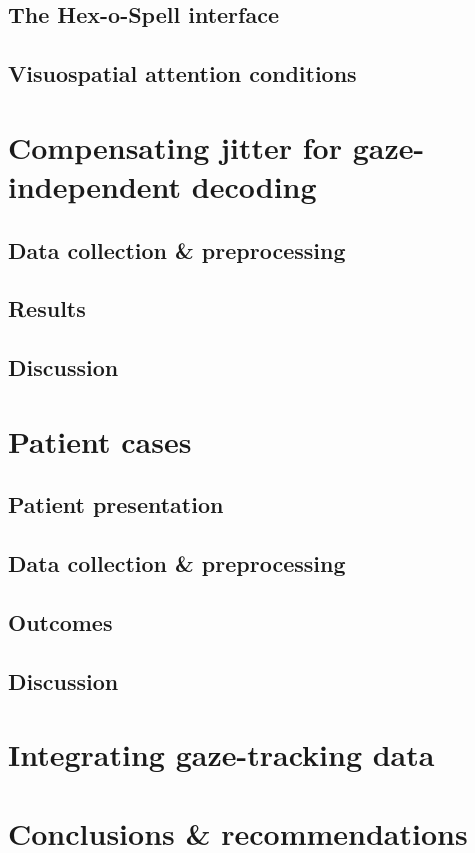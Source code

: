 \section{The Hex-o-Spell interface}
\section{Visuospatial attention conditions}

\chapter{Compensating jitter for gaze-independent decoding}
\section{Data collection \& preprocessing}
\section{Results}
\section{Discussion}

\chapter{Patient cases}
\section{Patient presentation}
\section{Data collection \& preprocessing}
\section{Outcomes}
\section{Discussion}

\chapter{Integrating gaze-tracking data}

\chapter{Conclusions \& recommendations}
